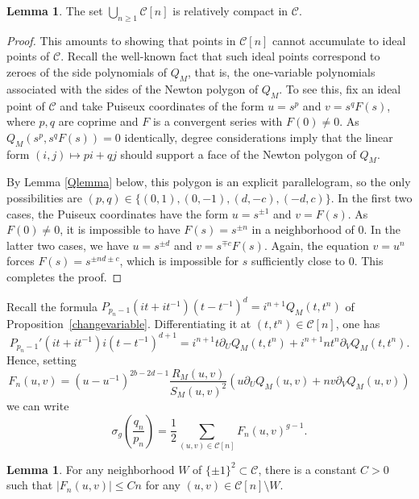\documentclass{amsart}
\newcommand{\calC}{\mathcal{C}}
\theoremstyle{definition}
\newtheorem{Lemma}[Theorem]{Lemma}
\begin{document}
\begin{Lemma}
The set $\bigcup_{n\ge 1}\calC[n]$ is relatively compact in $\calC$. 
\end{Lemma}
\begin{proof}
This amounts to showing that points in $\calC[n]$ cannot accumulate to ideal points of $\calC$. Recall the well-known fact that such ideal points correspond to zeroes of the side polynomials of $Q_M$, that is, the one-variable polynomials associated with  the sides of the Newton polygon of $Q_M$. To see this, fix an ideal point of $\calC$ and take Puiseux coordinates of the form $u=s^p$ and $v=s^qF(s)$, where $p,q$ are coprime and $F$ is a convergent series with $F(0)\neq 0$. As $Q_M(s^p,s^qF(s))=0$ identically, degree considerations imply that the linear form $(i,j)\mapsto pi+qj$ should support a face of the Newton polygon of $Q_M$. 

By Lemma \ref{Qlemma} below, this polygon is an explicit parallelogram, so the only possibilities are $(p,q)\in\{(0,1),(0,-1),(d,-c),(-d,c)\}$. In the first two cases, the Puiseux coordinates have the form $u=s^{\pm 1}$ and $v=F(s)$. As $F(0)\ne 0$, it is impossible to have $F(s)=s^{\pm n}$ in a neighborhood of $0$. In the latter two cases, we have $u=s^{\pm d}$ and $v=s^{\mp c}F(s)$. Again, the equation $v=u^n$ forces $F(s)=s^{ \pm nd\pm c}$, which is impossible for $s$ sufficiently close to $0$. This completes the proof.
\end{proof}


Recall the formula 
$P_{p_n-1}(it+it^{-1})(t-t^{-1})^d=i^{n+1} Q_M(t,t^n)$ of Proposition~\ref{changevariable}. Differentiating it at $(t,t^n)\in \calC[n]$, one has
\begin{equation}\label{derivP}
P_{p_n-1}'(it+it^{-1})i(t-t^{-1})^{d+1}=i^{n+1}t\partial_UQ_M(t,t^n)+i^{n+1}nt^{n}\partial_VQ_M(t,t^n).
\end{equation}
Hence, setting $$F_n(u,v)=(u-u^{-1})^{2b-2d-1}\frac{R_M(u,v)}{S_M(u,v)^2}\left( u\partial_UQ_M(u,v)+nv\partial_VQ_M(u,v)\right)$$
we can write
$$\sigma_g \left(\frac{q_n}{p_n}\right)=\frac{1}{2}\!\!\!\sum_{(u,v)\in \calC[n]}F_n(u,v)^{g-1}.$$

\begin{Lemma}
\label{lem.bdd1}
For any neighborhood $W$ of $\{\pm 1\}^2\subset \calC$, there is a constant $C>0$ such that $|F_n(u,v)|\le C n$ for any $(u,v)\in \calC[n]\setminus W$. 
\end{Lemma}
 
\end{document}
